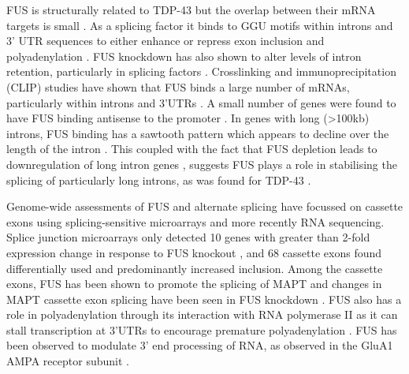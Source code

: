 FUS is structurally related to TDP-43 but the overlap between their mRNA targets is small \citep{Lagier-Tourenne2012-wa,Rogelj2012,Colombrita2012, Honda2014}. 
As a splicing factor it binds to GGU motifs within introns and 3' UTR sequences to either enhance or repress exon inclusion and polyadenylation \citep{Rogelj2012,Lagier-Tourenne2012-wa}.
FUS knockdown has also shown to alter levels of intron retention, particularly in splicing factors \citep{VanBlitterswijk2013, Nakaya2013}.
Crosslinking and immunoprecipitation (CLIP) studies have shown that FUS binds a large number of mRNAs, particularly within introns and 3'UTRs \citep{Lagier-Tourenne2012,Rogelj2012,Ishigaki2012}.
A small number of genes were found to have FUS binding antisense to the promoter \citep{Ishigaki2012}.
In genes with long (>100kb) introns, FUS binding has a sawtooth pattern which appears to decline over the length of the intron \citep{Rogelj2012}. 
This coupled with the fact that FUS depletion leads to downregulation of long intron genes \citep{Lagier-Tourenne2012}, suggests FUS plays a role in stabilising the splicing of particularly long introns, as was found for TDP-43 \citep{Polymenidou2011}.

Genome-wide assessments of FUS and alternate splicing have focussed on cassette exons using splicing-sensitive microarrays and more recently RNA sequencing. 
Splice junction microarrays only detected 10 genes with greater than 2-fold expression change in response to FUS knockout \citep{Rogelj2012}, and 68 cassette exons found differentially used and predominantly increased inclusion. 
Among the cassette exons, FUS has been shown to promote the splicing of MAPT \citep{Orozco2012} and changes in MAPT cassette exon splicing have been seen in FUS knockdown \citep{Ishigaki2012, Scekic-zahirovic2016}.
FUS also has a role in polyadenylation through its interaction with RNA polymerase II as it can stall transcription at 3'UTRs to encourage premature polyadenylation \citep{Masuda2015}. 
FUS has been observed to modulate 3' end processing of RNA, as observed in the GluA1 AMPA receptor subunit \citep{Udagawa2015}. %

